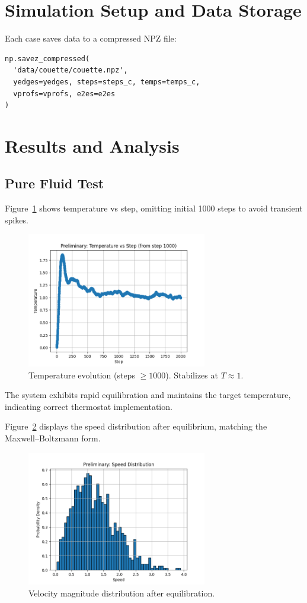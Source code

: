 \documentclass[11pt,a4paper]{article}
\begin{document}
\section{Simulation Setup and Data Storage}
Each case saves data to a compressed NPZ file:
\begin{lstlisting}[caption={Data saving example}]
np.savez_compressed(
  'data/couette/couette.npz',
  yedges=yedges, steps=steps_c, temps=temps_c,
  vprofs=vprofs, e2es=e2es
)
\end{lstlisting}

\section{Results and Analysis}
\subsection{Pure Fluid Test}
Figure~\ref{fig:pre_temp} shows temperature vs step, omitting initial 1000 steps to avoid transient spikes.
\begin{figure}[h]
  \centering
  \includegraphics[width=0.7\textwidth]{figures/preliminary/temperature_vs_step.png}
  \caption{Temperature evolution (steps $\ge1000$). Stabilizes at $T\approx1$.}
  \label{fig:pre_temp}
\end{figure}
The system exhibits rapid equilibration and maintains the target temperature, indicating correct thermostat implementation.

Figure~\ref{fig:pre_speed} displays the speed distribution after equilibrium, matching the Maxwell–Boltzmann form.
\begin{figure}[h]
  \centering
  \includegraphics[width=0.7\textwidth]{figures/preliminary/speed_distribution.png}
  \caption{Velocity magnitude distribution after equilibration.}
  \label{fig:pre_speed}
\end{figure}
\end{document}
